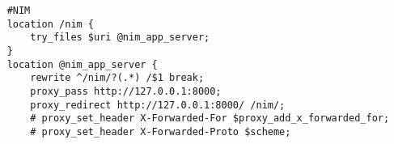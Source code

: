 \documentclass{article}
\begin{document}
\begin{verbatim}
    #NIM                                                                                                                                                                                                                                                     
    location /nim {                                                                                                                                                                                                                                           
        try_files $uri @nim_app_server;                                                                                                                                                                                                                       
    }                                                                                                                                                                                                                                                         
    location @nim_app_server {                                                                                                                                                                                                                                
        rewrite ^/nim/?(.*) /$1 break;                                                                                                                                                                                                                        
        proxy_pass http://127.0.0.1:8000;                                                                                                                                                                                                                     
        proxy_redirect http://127.0.0.1:8000/ /nim/;                                                                                                                                                                                                          
        # proxy_set_header X-Forwarded-For $proxy_add_x_forwarded_for;                                                                                                                                                                                        
        # proxy_set_header X-Forwarded-Proto $scheme;                                                                                                                                                                                                         

\end{verbatim}
\end{document}
